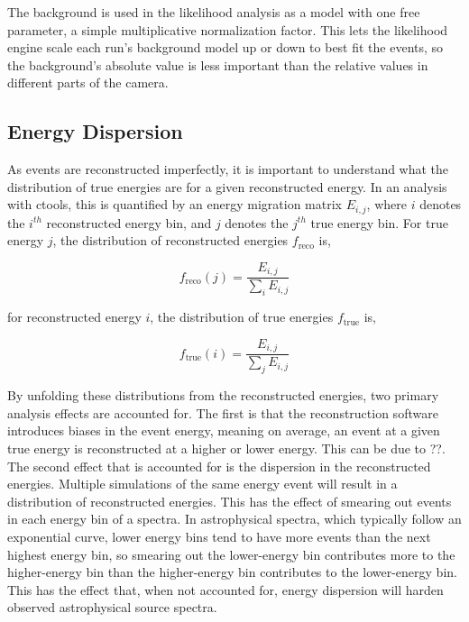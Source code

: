     The background is used in the likelihood analysis as a model with one free parameter, a simple multiplicative normalization factor.
    This lets the likelihood engine scale each run's background model up or down to best fit the events, so the background's absolute value is less important than the relative values in different parts of the camera.

  \subsection{Energy Dispersion}\label{subsec:edisp}
    As events are reconstructed imperfectly, it is important to understand what the distribution of true energies are for a given reconstructed energy.
    In an analysis with ctools, this is quantified by an energy migration matrix $E_{i,j}$, where $i$ denotes the $i^{th}$ reconstructed energy bin, and $j$ denotes the $j^{th}$ true energy bin.
    For true energy $j$, the distribution of reconstructed energies $f_{\text{reco}}$ is,

    \begin{equation} \label{eqn:edispreco}
    f_{\text{reco}}(j)=\frac{E_{i,j}}{ \sum_{i}E_{i,j} }
    \end{equation}

    for reconstructed energy $i$, the distribution of true energies $f_{\text{true}}$ is,

    \begin{equation} \label{eqn:edisptrue}
    f_{\text{true}}(i)=\frac{E_{i,j}}{ \sum_{j}E_{i,j} }
    \end{equation}

    By unfolding these distributions from the reconstructed energies, two primary analysis effects are accounted for.
    The first is that the reconstruction software introduces biases in the event energy, meaning on average, an event at a given true energy is reconstructed at a higher or lower energy.
    This can be due to ??.
    The second effect that is accounted for is the dispersion in the reconstructed energies.
    Multiple simulations of the same energy event will result in a distribution of reconstructed energies.
    This has the effect of smearing out events in each energy bin of a spectra.
    In astrophysical spectra, which typically follow an exponential curve, lower energy bins tend to have more events than the next highest energy bin, so smearing out the lower-energy bin contributes more to the higher-energy bin than the higher-energy bin contributes to the lower-energy bin.
    This has the effect that, when not accounted for, energy dispersion will harden observed astrophysical source spectra.

